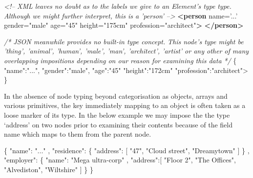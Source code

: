 \documentclass[12pt, ]{article}
\newenvironment{Shaded}{}{}
\newcommand{\KeywordTok}[1]{\textcolor[rgb]{0.00,0.44,0.13}{\textbf{{#1}}}}
\newcommand{\StringTok}[1]{\textcolor[rgb]{0.25,0.44,0.63}{{#1}}}
\newcommand{\CommentTok}[1]{\textcolor[rgb]{0.38,0.63,0.69}{\textit{{#1}}}}
\newcommand{\OtherTok}[1]{\textcolor[rgb]{0.00,0.44,0.13}{{#1}}}
\newcommand{\NormalTok}[1]{{#1}}
\begin{document}
\begin{Shaded}
\begin{Highlighting}[]
\CommentTok{<!--  }
\CommentTok{  XML leaves no doubt as to the labels we give to an Element's type }
\CommentTok{  type. Although we might further interpret, this is a 'person'}
\CommentTok{-->}
\KeywordTok{<person}\OtherTok{  name=}\StringTok{'...'}\OtherTok{ gender=}\StringTok{"male"}
\OtherTok{         age=}\StringTok{"45"}\OtherTok{ height=}\StringTok{"175cm"}\OtherTok{ profession=}\StringTok{"architect"}\KeywordTok{>}
\KeywordTok{</person>}
\end{Highlighting}
\end{Shaded}

\begin{Shaded}
\begin{Highlighting}[]
\CommentTok{/* JSON meanwhile provides no built-in type concept. }
\CommentTok{   This node's type might be 'thing', 'animal', 'human', 'male',}
\CommentTok{   'man', 'architect', 'artist' or any other of many overlapping}
\CommentTok{   impositions depending on our reason for examining this data}
\CommentTok{*/}
\NormalTok{\{  }\StringTok{"name"}\NormalTok{:}\StringTok{"..."}\NormalTok{, }\StringTok{"gender"}\NormalTok{:}\StringTok{"male"}\NormalTok{, }\StringTok{"age"}\NormalTok{:}\StringTok{"45"} 
   \StringTok{"height"}\NormalTok{:}\StringTok{"172cm"} \StringTok{"profession"}\NormalTok{:}\StringTok{"architect"}\NormalTok{>}
\NormalTok{\}         }
\end{Highlighting}
\end{Shaded}

In the absence of node typing beyond categorisation as objects, arrays
and various primitives, the key immediately mapping to an object is
often taken as a loose marker of its type. In the below example we may
impose the the type `address' on two nodes prior to examining their
contents because of the field name which maps to them from the parent
node.

\begin{Shaded}
\begin{Highlighting}[]
\NormalTok{\{}
   \StringTok{"name"}\NormalTok{: }\StringTok{"..."}
\NormalTok{,  }\StringTok{"residence"}\NormalTok{: \{}
      \StringTok{"address"}\NormalTok{: [}
         \StringTok{"47"}\NormalTok{, }\StringTok{"Cloud street"}\NormalTok{, }\StringTok{"Dreamytown"}
      \NormalTok{]}
   \NormalTok{\}}
\NormalTok{,  }\StringTok{"employer"}\NormalTok{: \{}
      \StringTok{"name"}\NormalTok{: }\StringTok{"Mega ultra-corp"}
   \NormalTok{,  }\StringTok{"address"}\NormalTok{:[}
         \StringTok{"Floor 2"}\NormalTok{, }\StringTok{"The Offices"}\NormalTok{, }\StringTok{"Alvediston"}\NormalTok{, }\StringTok{"Wiltshire"}      
      \NormalTok{]}
   \NormalTok{\}   }
\NormalTok{\}}
\end{Highlighting}
\end{Shaded}
\end{document}

